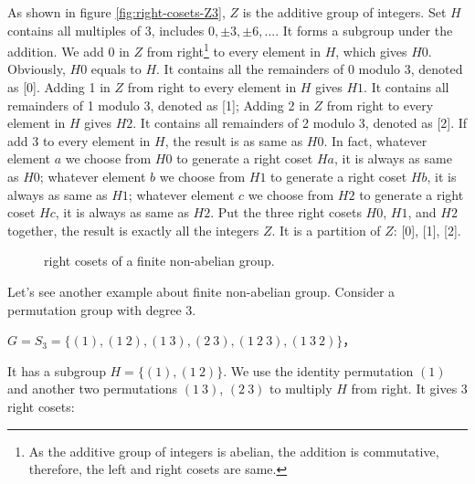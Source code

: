 \documentclass{article}
\begin{document}
As shown in figure \ref{fig:right-cosets-Z3}, $Z$ is the additive group of integers. Set $H$ contains all multiples of 3, includes $0, \pm 3, \pm 6, ...$. It forms a subgroup under the addition. We add 0 in $Z$ from right\footnote{As the additive group of integers is abelian, the addition is commutative, therefore, the left and right cosets are same.} to every element in $H$, which gives $H0$. Obviously, $H0$ equals to $H$. It contains all the remainders of 0 modulo 3, denoted as [0]. Adding 1 in $Z$ from right to every element in $H$ gives $H1$. It contains all remainders of 1 modulo 3, denoted as [1]; Adding 2 in $Z$ from right to every element in $H$ gives $H2$. It contains all remainders of 2 modulo 3, denoted as [2]. If add 3 to every element in $H$, the result is as same as $H0$. In fact, whatever element $a$ we choose from $H0$ to generate a right coset $Ha$, it is always as same as $H0$; whatever element $b$ we choose from $H1$ to generate a right coset $Hb$, it is always as same as $H1$; whatever element $c$ we choose from $H2$ to generate a right coset $Hc$, it is always as same as $H2$. Put the three right cosets $H0$, $H1$, and $H2$ together, the result is exactly all the integers $Z$. It is a partition of $Z$: [0], [1], [2].

\begin{figure}[htbp]
\centering
{}
\caption{right cosets of a finite non-abelian group.}
\label{fig:right-cosets-S3}
\end{figure}

Let's see another example about finite non-abelian group. Consider a permutation group with degree 3.

$G = S_3 = \{(1), (1\ 2), (1\ 3), (2\ 3), (1\ 2\ 3), (1\ 3\ 2)\}$，

It has a subgroup $H = \{(1), (1\ 2)\}$. We use the identity permutation $(1)$ and another two permutations $(1\ 3)$, $(2\ 3)$ to multiply $H$ from right. It gives 3 right cosets:
\end{document}
